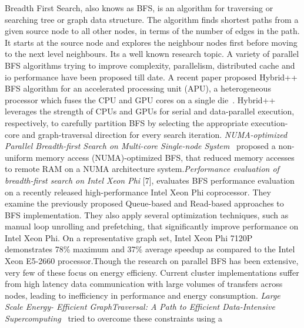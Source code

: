 Breadth First Search, also knows as BFS, is an algorithm for
traversing or searching tree or graph data structure. The algorithm
finds shortest paths from a given source node to all other nodes, in
terms of the number of edges in the path. It starts at the source node
and explores the neighbour nodes first before moving to the next level
neighbours.  Its a well known research topic. A variety of parallel
BFS algorithms trying to improve complexity, parallelism, distributed
cache and io performance have been proposed till date.\newline
A recent paper proposed Hybrid++ BFS algorithm for an accelerated
processing unit (APU), a heterogeneous processor which fuses the CPU
and GPU cores on a single die~\cite{HYBRIS}. Hybrid++ leverages the
strength of CPUs and GPUs for serial and data-parallel execution,
respectively, to carefully partition BFS by selecting the appropriate
execution-core and graph-traversal direction for every search
iteration.\newline
\emph{NUMA-optimized Parallel Breadth-first Search on Multi-core
Single-node System}~\cite{NUMA-BFS} proposed a non-uniform memory
access (NUMA)-optimized BFS, that reduced memory accesses to remote
RAM on a NUMA architecture system.\newline \emph{Performance
evaluation of breadth-first search on Intel Xeon Phi} [7], evaluates
BFS performance evaluation on a recently released high-performance
Intel Xeon Phi coprocessor. They examine the previously proposed
Queue-based and Read-based approaches to BFS implementation. They also
apply several optimization techniques, such as manual loop unrolling
and prefetching, that significantly improve performance on Intel Xeon
Phi. On a representative graph set, Intel Xeon Phi 7120P demonstrates
78\% maximum and 37\% average speedup as compared to the Intel Xeon
E5-2660 processor.\newline Though the research on parallel BFS has
been extensive, very few of these focus on energy efficieny.\newline
Current cluster implementations suffer from high latency data
communication with large volumes of transfers across nodes, leading to
inefficiency in performance and energy consumption. \emph{Large Scale
Energy- Efficient GraphTraversal: A Path to Efficient Data-Intensive
Supercomputing}~\cite{INTEL-BFS} tried to overcome these constraints using a
